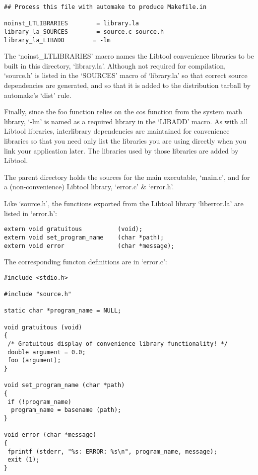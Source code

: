  

\begin{Verbatim}[frame=single]
## Process this file with automake to produce Makefile.in

noinst_LTLIBRARIES        = library.la
library_la_SOURCES        = source.c source.h
library_la_LIBADD        = -lm
\end{Verbatim}




The `noinst\_{}LTLIBRARIES' macro names the Libtool convenience libraries to be built in this directory, `library.la'. Although not required for compilation, `source.h' is listed in the `SOURCES' macro of `library.la' so that correct source dependencies are generated, and so that it is added to the distribution tarball by automake's `dist' rule. 


Finally, since the foo function relies on the cos function from the system math library, `-lm' is named as a required library in the `LIBADD' macro. As with all Libtool libraries, interlibrary dependencies are maintained for convenience libraries so that you need only list the libraries you are using directly when you link your application later. The libraries used by those libraries are added by Libtool. 


The parent directory holds the sources for the main executable, `main.c',
and for a (non-convenience) Libtool library, `error.c' \& `error.h'. 


Like `source.h', the functions exported from the Libtool library `liberror.la' are listed in `error.h': 

\begin{Verbatim}[frame=single]
extern void gratuitous          (void);
extern void set_program_name    (char *path);
extern void error               (char *message);
\end{Verbatim}





 The corresponding functon definitions are in `error.c': 

\begin{Verbatim}[frame=single]
#include <stdio.h>

#include "source.h"

static char *program_name = NULL;

void gratuitous (void)
{
 /* Gratuitous display of convenience library functionality! */
 double argument = 0.0;
 foo (argument);
}

void set_program_name (char *path)
{
 if (!program_name)
  program_name = basename (path);
}

void error (char *message)
{
 fprintf (stderr, "%s: ERROR: %s\n", program_name, message);
 exit (1);
}
\end{Verbatim}

